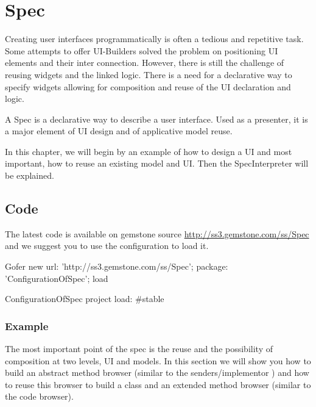 \documentclass[a4paper,10pt,twoside]{book}
\begin{document}
\fi
\sloppy

\chapter{Spec}

Creating user interfaces programmatically is often a tedious and repetitive task. Some attempts to offer UI-Builders solved the problem on positioning UI elements and their inter connection. However, there is still the challenge of reusing widgets and the linked logic. There is a need for a declarative way to specify widgets allowing for composition and reuse of the UI declaration and logic. 

A Spec is a declarative way to describe a user interface. Used as a presenter, it is a major element of UI design and of applicative model reuse.

In this chapter, we will begin by an example of how to design a UI and most important, how to reuse an existing model and UI. Then the SpecInterpreter will be explained.

\section{Code}

The latest code is available on gemstone source \url{http://ss3.gemstone.com/ss/Spec} and we suggest you to use the configuration to load it.

\begin{code}{}
Gofer new
	url: 'http://ss3.gemstone.com/ss/Spec';
	package: 'ConfigurationOfSpec';
	load
	
ConfigurationOfSpec project load: #stable
\end{code}

\subsection{Example}

The most important point of the spec is the reuse and the possibility of composition at two levels, UI and models. In this section we will show you how to build an abstract method browser (similar to the senders/implementor ) and how to reuse this browser to build a class and an extended method browser (similar to the code browser).
\end{document}
